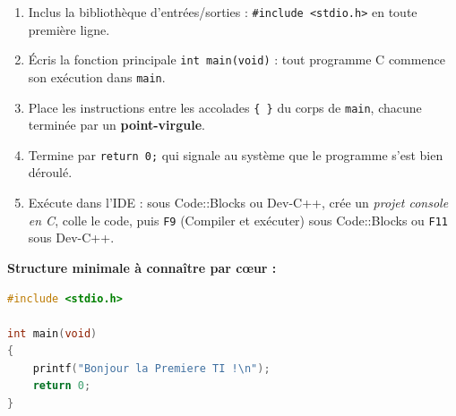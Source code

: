 \documentclass[11pt]{article}
\newcommand{\cle}[1]{{\popxbold\color{popdark}#1}}
\begin{document}
\begin{methode}
\begin{enumerate}
\item \cle{Inclus} la bibliothèque d'entrées/sorties : \texttt{\#include <stdio.h>} en toute première ligne.
\item \cle{Écris} la fonction principale \texttt{int main(void)} : tout programme C commence son exécution dans \texttt{main}.
\item \cle{Place} les instructions entre les accolades \texttt{\{ \}} du corps de \texttt{main}, chacune terminée par un \textbf{point-virgule}.
\item \cle{Termine} par \texttt{return 0;} qui signale au système que le programme s'est bien déroulé.
\item \cle{Exécute} dans l'IDE : sous Code::Blocks ou Dev-C++, crée un \emph{projet console en C}, colle le code, puis \texttt{F9} (Compiler et exécuter) sous Code::Blocks ou \texttt{F11} sous Dev-C++.
\end{enumerate}
\textbf{Structure minimale à connaître par cœur :}
\begin{lstlisting}[language=C]
#include <stdio.h>

int main(void)
{
    printf("Bonjour la Premiere TI !\n");
    return 0;
}
\end{lstlisting}
\end{methode}
\end{document}

